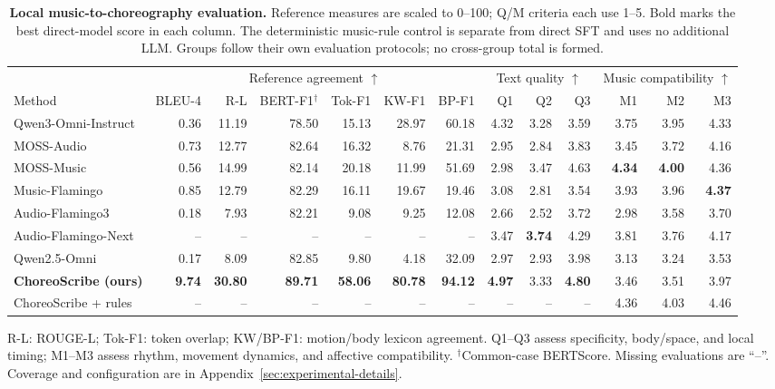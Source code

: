 \begin{table}[t]
\centering
\caption{\textbf{Local music-to-choreography evaluation.} Reference measures are scaled to 0--100; Q/M criteria each use 1--5. Bold marks the best direct-model score in each column. The deterministic music-rule control is separate from direct SFT and uses no additional LLM. Groups follow their own evaluation protocols; no cross-group total is formed.}
\label{tab:local-results}
\label{tab:e2-full2000-v2}
\label{tab:refinement-d123}
\begingroup\scriptsize
\setlength{\tabcolsep}{2.3pt}
\renewcommand{\arraystretch}{1.16}
\begin{tabular*}{\textwidth}{@{\extracolsep{\fill}}lrrrrrrrrrrrr@{}}
\toprule
& \multicolumn{6}{c}{Reference agreement $\uparrow$} & \multicolumn{3}{c}{Text quality $\uparrow$} & \multicolumn{3}{c}{Music compatibility $\uparrow$} \\
\cmidrule(lr){2-7}\cmidrule(lr){8-10}\cmidrule(lr){11-13}
Method & BLEU-4 & R-L & BERT-F1$^\dagger$ & Tok-F1 & KW-F1 & BP-F1 & Q1 & Q2 & Q3 & M1 & M2 & M3 \\
\midrule
Qwen3-Omni-Instruct & 0.36 & 11.19 & 78.50 & 15.13 & 28.97 & 60.18 & 4.32 & 3.28 & 3.59 & 3.75 & 3.95 & 4.33 \\
MOSS-Audio & 0.73 & 12.77 & 82.64 & 16.32 & 8.76 & 21.31 & 2.95 & 2.84 & 3.83 & 3.45 & 3.72 & 4.16 \\
MOSS-Music & 0.56 & 14.99 & 82.14 & 20.18 & 11.99 & 51.69 & 2.98 & 3.47 & 4.63 & \textbf{4.34} & \textbf{4.00} & 4.36 \\
Music-Flamingo & 0.85 & 12.79 & 82.29 & 16.11 & 19.67 & 19.46 & 3.08 & 2.81 & 3.54 & 3.93 & 3.96 & \textbf{4.37} \\
Audio-Flamingo3 & 0.18 & 7.93 & 82.21 & 9.08 & 9.25 & 12.08 & 2.66 & 2.52 & 3.72 & 2.98 & 3.58 & 3.70 \\
Audio-Flamingo-Next & -- & -- & -- & -- & -- & -- & 3.47 & \textbf{3.74} & 4.29 & 3.81 & 3.76 & 4.17 \\
Qwen2.5-Omni & 0.17 & 8.09 & 82.85 & 9.80 & 4.18 & 32.09 & 2.97 & 2.93 & 3.98 & 3.13 & 3.24 & 3.53 \\
\midrule
\textbf{ChoreoScribe (ours)} & \textbf{9.74} & \textbf{30.80} & \textbf{89.71} & \textbf{58.06} & \textbf{80.78} & \textbf{94.12} & \textbf{4.97} & 3.33 & \textbf{4.80} & 3.46 & 3.51 & 3.97 \\
\midrule
ChoreoScribe + rules & -- & -- & -- & -- & -- & -- & -- & -- & -- & 4.36 & 4.03 & 4.46 \\
\bottomrule
\end{tabular*}
\par\vspace{3pt}
\begin{minipage}{\textwidth}\scriptsize
R-L: ROUGE-L; Tok-F1: token overlap; KW/BP-F1: motion/body lexicon agreement.
Q1--Q3 assess specificity, body/space, and local timing; M1--M3 assess rhythm,
movement dynamics, and affective compatibility. $^\dagger$Common-case BERTScore.
Missing evaluations are ``--''. Coverage and configuration are in Appendix~\ref{sec:experimental-details}.
\end{minipage}
\endgroup
\end{table}
